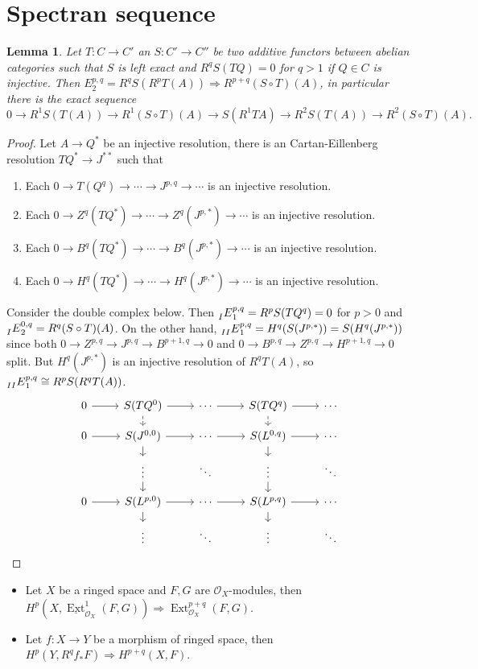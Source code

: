\documentclass[leqno]{amsart}
\newcommand{\1}{\mathbf{1}}
\DeclareMathOperator{\Ext}{Ext}
\newtheorem{lem}[thm]{Lemma}
\theoremstyle{definition}
\theoremstyle{remark}
\begin{document}
\section{Spectran sequence}

\begin{lem}
	Let $T\colon C\to C'$ an $S\colon C'\to C''$
	be two additive functors between abelian categories
	such that $S$ is left exact 
	and $R^qS(TQ)=0$ for $q>1$ if $Q\in C$ is injective.
	Then $E^{p,q}_2=R^qS(R^pT(A))\Longrightarrow 
	R^{p+q}(S\circ T)(A)$, in particular
	there is the exact sequence
	\[
		0\to R^1S(T(A))\to R^1(S\circ T)(A)\to 
		S(R^1TA)\to R^2S(T(A))\to R^2(S\circ T)(A).
	\]
\end{lem}
\begin{proof}
	Let $A\to Q^*$ be an injective resolution,
	there is an Cartan-Eillenberg resolution
	$TQ^*\to J^{**}$ such that 
	\begin{enumerate}[label=(\alph*)]
	\item Each  
	$0\to T(Q^q)\to \cdots\to J^{p,q}\to\cdots$ 
	is an injective resolution.
	\item Each  
	$0\to Z^q(TQ^*)\to \cdots\to Z^q(J^{p,*})\to\cdots$ 
	is an injective resolution.
	\item Each  
	$0\to B^q(TQ^*)\to \cdots\to B^q(J^{p,*})\to\cdots$ 
	is an injective resolution.
	\item Each  
	$0\to H^q(TQ^*)\to \cdots\to H^q(J^{p,*})\to\cdots$ 
	is an injective resolution.
	\end{enumerate}
	Consider the double complex below.
	Then $\prescript{}{I}{E}_1^{p,q}=R^pS(TQ^q)=0$ for $p>0$
	and $\prescript{}{I}{E}_2^{0,q}=R^q(S\circ T)(A)$. 
	On the other hand, 
	$\prescript{}{II}{E}_1^{p,q}=H^q(S(J^{p,*}))=S(H^q(J^{p,*}))$
	since both
	$0\to Z^{p,q}\to J^{p,q}\to B^{p+1,q}\to 0$ and
	$0\to B^{p,q}\to Z^{p,q}\to H^{p+1,q}\to 0$ split.
	But $H^q(J^{p,*})$ is an injective resolution of $R^qT(A)$,
	so  $\prescript{}{II}{E}_1^{p,q}\cong R^pS(R^qT(A))$.
\[
\begin{tikzcd}[row sep=small]
	0 \arrow[r] &
	S(TQ^0) \arrow[r]\arrow[d,dashed] & \cdots \arrow[r]&
	S(TQ^q)\arrow[r]\arrow[d,dashed] & \cdots \\
	0 \arrow[r] &
	S(J^{0,0}) \arrow[r]\arrow[d] & \cdots \arrow[r]&
	S(L^{0,q}) \arrow[r]\arrow[d] & \cdots \\
	&
	\vdots \arrow[d]& \ddots&
	\vdots \arrow[d]& \ddots \\
	0 \arrow[r] &
	S(L^{p,0}) \arrow[r]\arrow[d] & \cdots \arrow[r]&
	S(L^{p,q}) \arrow[r]\arrow[d] & \cdots \\
	&
	\vdots & \ddots&
	\vdots & \ddots 
\end{tikzcd}
\]
\end{proof}
\begin{itemize}
	\item Let $X$ be a ringed space 
	and $F,G$ are $\mathcal{O}_X$-modules, then
	$H^p(X,\underline{\Ext}^1_{\mathcal{O}_X}(F,G))
	\Longrightarrow \Ext^{p+q}_{\mathcal{O}_X}(F,G)$.
	\item Let $f\colon X\to Y$ be a morphism of ringed space,
	then $H^p(Y, R^qf_*F)\Longrightarrow H^{p+q}(X,F)$.
\end{itemize}
\end{document}
